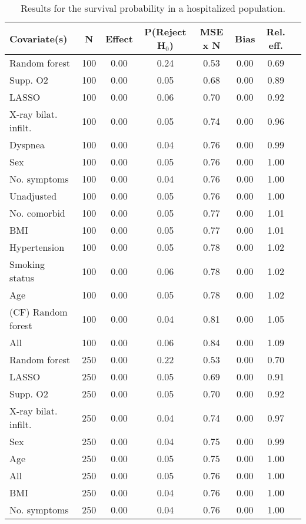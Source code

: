 \documentclass{article}
\begin{document}
{\tabcolsep=6pt  %
\begin{longtable}{lccccccc}
\caption{Results for the survival probability in a hospitalized population.} \\
Covariate(s) & N & Effect & P(Reject H$_0$) & MSE x N & Bias & Rel. eff.\\ \midrule
Random forest & 100 & 0.00 & 0.24 & 0.53 & 0.00 & 0.69 \\ 
Supp. O2 & 100 & 0.00 & 0.05 & 0.68 & 0.00 & 0.89 \\ 
LASSO & 100 & 0.00 & 0.06 & 0.70 & 0.00 & 0.92 \\ 
X-ray bilat. infilt. & 100 & 0.00 & 0.05 & 0.74 & 0.00 & 0.96 \\ 
Dyspnea & 100 & 0.00 & 0.04 & 0.76 & 0.00 & 0.99 \\ 
Sex & 100 & 0.00 & 0.05 & 0.76 & 0.00 & 1.00 \\ 
No. symptoms & 100 & 0.00 & 0.04 & 0.76 & 0.00 & 1.00 \\ 
Unadjusted & 100 & 0.00 & 0.05 & 0.76 & 0.00 & 1.00 \\ 
No. comorbid & 100 & 0.00 & 0.05 & 0.77 & 0.00 & 1.01 \\ 
BMI & 100 & 0.00 & 0.05 & 0.77 & 0.00 & 1.01 \\ 
Hypertension & 100 & 0.00 & 0.05 & 0.78 & 0.00 & 1.02 \\ 
Smoking status & 100 & 0.00 & 0.06 & 0.78 & 0.00 & 1.02 \\ 
Age & 100 & 0.00 & 0.05 & 0.78 & 0.00 & 1.02 \\ 
(CF) Random forest & 100 & 0.00 & 0.04 & 0.81 & 0.00 & 1.05 \\ 
All & 100 & 0.00 & 0.06 & 0.84 & 0.00 & 1.09 \\ \midrule() 
Random forest & 250 & 0.00 & 0.22 & 0.53 & 0.00 & 0.70 \\ 
LASSO & 250 & 0.00 & 0.05 & 0.69 & 0.00 & 0.91 \\ 
Supp. O2 & 250 & 0.00 & 0.05 & 0.70 & 0.00 & 0.92 \\ 
X-ray bilat. infilt. & 250 & 0.00 & 0.04 & 0.74 & 0.00 & 0.97 \\ 
Sex & 250 & 0.00 & 0.04 & 0.75 & 0.00 & 0.99 \\ 
Age & 250 & 0.00 & 0.05 & 0.75 & 0.00 & 1.00 \\ 
All & 250 & 0.00 & 0.05 & 0.76 & 0.00 & 1.00 \\ 
BMI & 250 & 0.00 & 0.04 & 0.76 & 0.00 & 1.00 \\ 
No. symptoms & 250 & 0.00 & 0.04 & 0.76 & 0.00 & 1.00 \\ 

\end{longtable}}
\end{document}
